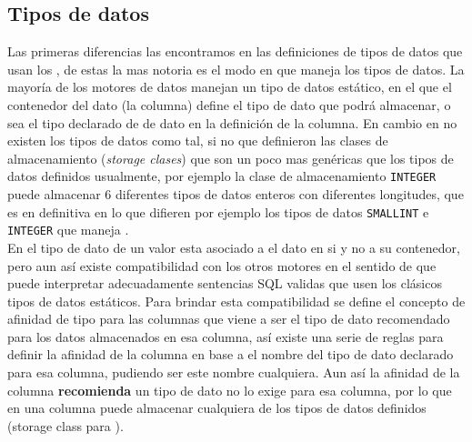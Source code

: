 \subsection{Tipos de datos}
Las primeras diferencias las encontramos en las definiciones de tipos de datos que usan los \dd, de estas la mas notoria es el modo en que \s maneja los tipos de datos. La mayoría de los motores de datos manejan un tipo de datos estático, en el que el contenedor del dato (la columna) define el tipo de dato que podrá almacenar, o sea el tipo declarado de de dato en la definición de la columna. En cambio en \s no existen los tipos de datos como tal, si no que definieron las clases de almacenamiento (\textit{storage clases}) que son un poco mas genéricas que los tipos de datos definidos usualmente, por ejemplo la clase de almacenamiento \verb=INTEGER= puede almacenar 6 diferentes tipos de datos enteros con diferentes longitudes, que es en definitiva en lo que difieren por ejemplo los tipos de datos \verb=SMALLINT= e \verb=INTEGER= que maneja \m.\\

 En \s el tipo de dato de un valor esta asociado a el dato en si y no a su contenedor, pero aun así existe compatibilidad con los otros motores en el sentido de que \s puede interpretar adecuadamente sentencias SQL validas que usen los clásicos tipos de datos estáticos. Para brindar esta compatibilidad se define el concepto de afinidad de tipo para las columnas que viene a ser el tipo de dato recomendado para los datos almacenados en esa columna, así existe una serie de reglas para definir la afinidad de la columna en base a el nombre del tipo de dato declarado para esa columna, pudiendo ser este nombre cualquiera. Aun así la afinidad de la columna \textbf{recomienda} un tipo de dato no lo exige para esa columna, por lo que en \s una columna puede almacenar cualquiera de los tipos de datos definidos (storage class para \s).\\
 
